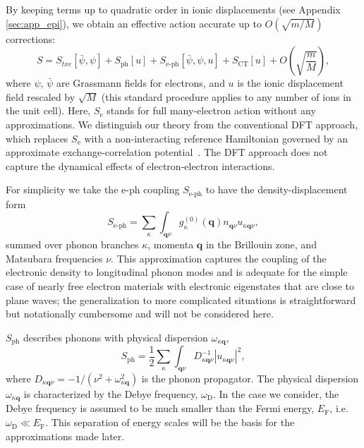 \documentclass[%
 reprint,
superscriptaddress,
 amsmath,amssymb,
 aps,
prx,
]{revtex4-2}
\newcommand{\bq}{\mathbf{q}}
\newcommand{\txe}{\text{e}}
\newcommand{\txD}{\text{D}}
\newcommand{\txF}{\text{F}}
\newcommand{\txph}{\text{ph}}
\newcommand{\txCT}{\text{CT}}
\newcommand{\txeph}{\text{e-ph}}
\begin{document}
By keeping terms up to quadratic order in ionic displacements (see Appendix \ref{sec:app_epi}), we obtain an effective 
action accurate up to $O(\sqrt{m/M})$ corrections:
\begin{equation}
\label{eq:full_action}
    S=S_{txe}[\bar{\psi}, \psi] + S_{\txph}[u] + S_{\txeph}[\bar{\psi}, \psi, u] +S_{\txCT}[u]+O\left(\sqrt{\frac{m}{M}}\right),
\end{equation}
where $\psi$, $\bar{\psi}$ are Grassmann fields for electrons, and $u$ is the ionic displacement field rescaled by $\sqrt{M}$ (this standard procedure applies to any number of ions in the unit cell). Here, $S_\txe$ stands for full many-electron action without any approximations. We distinguish our theory from the conventional DFT approach, which replaces $S_\txe$ with a non-interacting reference Hamiltonian governed by an approximate exchange-correlation potential~\cite{kohn1964,kohn1965}. The DFT approach does not capture the dynamical effects of electron-electron interactions.

For simplicity we take the e-ph coupling $S_{\txeph}$ to have the density-displacement form 
\begin{equation}
    S_{\txeph} =\sum_{\kappa}\int_{\bq\nu} g^{(0)}_{\kappa}(\bq)
    n_{\bq\nu} u_{\kappa\bq\nu},
    \label{eq:phaction}
\end{equation}
summed over phonon branches $\kappa$, momenta $\bq$ in the Brillouin zone,
and Matsubara frequencies $\nu$. This approximation captures the coupling of the electronic density to longitudinal phonon modes and is adequate for the simple case of nearly free electron materials with electronic eigenstates that are close to plane waves; the generalization to more complicated situations is straightforward but notationally cumbersome and will not be considered here.

$S_{\txph}$ describes phonons with  physical dispersion $\omega_{\kappa\bq}$,
\begin{equation}
\label{eq:phonon_action}
   S_{\txph} = \frac{1}{2}\sum_{\kappa}\int_{\bq\nu} D^{-1}_{\kappa\bq\nu} \left|u_{\kappa\bq\nu}\right|^2,
\end{equation}
where $D_{\kappa\bq\nu}=-1/(\nu^2+\omega_{\kappa\bq}^2)$ is the phonon propagator. The physical dispersion $\omega_{\kappa\bq}$ is characterized by the Debye frequency, $\omega_\txD$. In the case we consider, the Debye frequency is assumed to be much smaller than the Fermi energy, $E_\txF$, i.e. $\omega_\txD\ll E_\txF$. This separation of energy scales will be the basis for the approximations made later.
\end{document}
